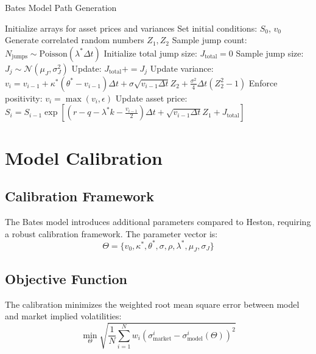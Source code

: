 \documentclass[12pt,a4paper]{article}
\begin{document}
\begin{algorithm}[H]
\caption{Bates Model Path Generation}
\begin{algorithmic}[1]
\State Initialize arrays for asset prices and variances
\State Set initial conditions: $S_0$, $v_0$
    \State Generate correlated random numbers $Z_1, Z_2$
    \State Sample jump count: $N_{\text{jumps}} \sim \text{Poisson}(\lambda^* \Delta t)$
    \State Initialize total jump size: $J_{\text{total}} = 0$
            \State Sample jump size: $J_j \sim \mathcal{N}(\mu_J, \sigma_J^2)$
            \State Update: $J_{\text{total}} += J_j$
        \EndFor
    \EndIf
    \State Update variance: $v_i = v_{i-1} + \kappa^*(\theta^* - v_{i-1})\Delta t + \sigma\sqrt{v_{i-1} \Delta t} Z_2 + \frac{\sigma^2}{4}\Delta t(Z_2^2 - 1)$
    \State Enforce positivity: $v_i = \max(v_i, \epsilon)$
    \State Update asset price: $S_i = S_{i-1} \exp[(r - q - \lambda^*k - \frac{v_{i-1}}{2})\Delta t + \sqrt{v_{i-1} \Delta t} Z_1 + J_{\text{total}}]$
\EndFor
\end{algorithmic}
\end{algorithm}

\section{Model Calibration}

\subsection{Calibration Framework}

The Bates model introduces additional parameters compared to Heston, requiring a robust calibration framework. The parameter vector is:
\begin{equation}
\Theta = \{v_0, \kappa^*, \theta^*, \sigma, \rho, \lambda^*, \mu_J, \sigma_J\}
\end{equation}

\subsection{Objective Function}

The calibration minimizes the weighted root mean square error between model and market implied volatilities:
\begin{equation}
\min_{\Theta} \sqrt{\frac{1}{N} \sum_{i=1}^{N} w_i \left(\sigma_{\text{market}}^i - \sigma_{\text{model}}^i(\Theta)\right)^2}
\end{equation}
\end{document}
